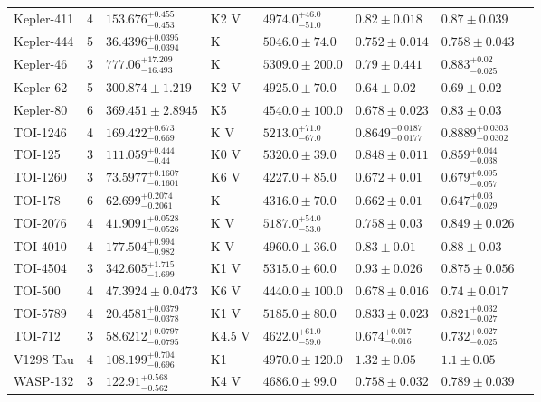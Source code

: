 \begin{tabular}{lrllllll}
Kepler-411 & 4 & $153.676^{+0.455}_{-0.453}$ & K2 V & $4974.0^{+46.0}_{-51.0}$ & $0.82 \pm 0.018$ & $0.87 \pm 0.039$ & \cite{WANG_ET_AL__2014} \\
Kepler-444 & 5 & $36.4396^{+0.0395}_{-0.0394}$ & K & $5046.0 \pm 74.0$ & $0.752 \pm 0.014$ & $0.758 \pm 0.043$ & \cite{CAMPANTE_ET_AL__2015} \\
Kepler-46 & 3 & $777.06^{+17.209}_{-16.493}$ & K & $5309.0 \pm 200.0$ & $0.79 \pm 0.441$ & $0.883^{+0.02}_{-0.025}$ & \cite{ROWE_ET_AL__2014} \\
Kepler-62 & 5 & $300.874 \pm 1.219$ & K2 V & $4925.0 \pm 70.0$ & $0.64 \pm 0.02$ & $0.69 \pm 0.02$ & \cite{BORUCKI_ET_AL__2013} \\
Kepler-80 & 6 & $369.451 \pm 2.8945$ & K5 & $4540.0 \pm 100.0$ & $0.678 \pm 0.023$ & $0.83 \pm 0.03$ & \cite{SHALLUE__AMP__VANDERBURG_2018} \\
TOI-1246 & 4 & $169.422^{+0.673}_{-0.669}$ & K V & $5213.0^{+71.0}_{-67.0}$ & $0.8649^{+0.0187}_{-0.0177}$ & $0.8889^{+0.0303}_{-0.0302}$ & \cite{MACDOUGALL_ET_AL__2023} \\
TOI-125 & 3 & $111.059^{+0.444}_{-0.44}$ & K0 V & $5320.0 \pm 39.0$ & $0.848 \pm 0.011$ & $0.859^{+0.044}_{-0.038}$ & \cite{NIELSEN_ET_AL__2020} \\
TOI-1260 & 3 & $73.5977^{+0.1607}_{-0.1601}$ & K6 V & $4227.0 \pm 85.0$ & $0.672 \pm 0.01$ & $0.679^{+0.095}_{-0.057}$ & \cite{LAM_ET_AL_2023} \\
TOI-178 & 6 & $62.699^{+0.2074}_{-0.2061}$ & K & $4316.0 \pm 70.0$ & $0.662 \pm 0.01$ & $0.647^{+0.03}_{-0.029}$ & \cite{LELEU_ET_AL__2024} \\
TOI-2076 & 4 & $41.9091^{+0.0528}_{-0.0526}$ & K V & $5187.0^{+54.0}_{-53.0}$ & $0.758 \pm 0.03$ & $0.849 \pm 0.026$ & \cite{KOKORI_ET_AL__2023} \\
TOI-4010 & 4 & $177.504^{+0.994}_{-0.982}$ & K V & $4960.0 \pm 36.0$ & $0.83 \pm 0.01$ & $0.88 \pm 0.03$ & \cite{KUNIMOTO_ET_AL__2023} \\
TOI-4504 & 3 & $342.605^{+1.715}_{-1.699}$ & K1 V & $5315.0 \pm 60.0$ & $0.93 \pm 0.026$ & $0.875 \pm 0.056$ & \cite{VITKOVA_ET_AL_2025} \\
TOI-500 & 4 & $47.3924 \pm 0.0473$ & K6 V & $4440.0 \pm 100.0$ & $0.678 \pm 0.016$ & $0.74 \pm 0.017$ & \cite{SERRANO_ET_AL_2022} \\
TOI-5789 & 4 & $20.4581^{+0.0379}_{-0.0378}$ & K1 V & $5185.0 \pm 80.0$ & $0.833 \pm 0.023$ & $0.821^{+0.032}_{-0.027}$ & \cite{BONOMO_ET_AL_2026} \\
TOI-712 & 3 & $58.6212^{+0.0797}_{-0.0795}$ & K4.5 V & $4622.0^{+61.0}_{-59.0}$ & $0.674^{+0.017}_{-0.016}$ & $0.732^{+0.027}_{-0.025}$ & \cite{VACH_ET_AL__2022} \\
V1298 Tau & 4 & $108.199^{+0.704}_{-0.696}$ & K1 & $4970.0 \pm 120.0$ & $1.32 \pm 0.05$ & $1.1 \pm 0.05$ & \cite{LIVINGSTON_ET_AL_2026} \\
WASP-132 & 3 & $122.91^{+0.568}_{-0.562}$ & K4 V & $4686.0 \pm 99.0$ & $0.758 \pm 0.032$ & $0.789 \pm 0.039$ & \cite{GRIEVES_ET_AL__2025} \\
\bottomrule
\end{tabular}
